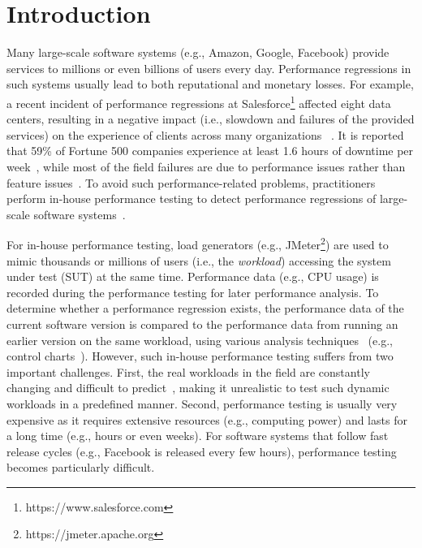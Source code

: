 \section{Introduction} \label{sec:intro}

Many large-scale software systems (e.g., Amazon, Google, Facebook) provide services to millions or even billions of users every day.
Performance regressions in such systems usually lead to both reputational and monetary losses. 
For example, a recent incident of performance regressions at Salesforce\footnote{https://www.salesforce.com} affected eight data centers, resulting in a negative impact (i.e., slowdown and failures of the provided services) on the experience of clients across many organizations ~\citep{SaleForcePerfDegradation2019}.
It is reported that 59\% of Fortune 500 companies experience at least 1.6 hours of downtime per week~\citep{SyncsortWhitePaper2018}, while most of the field failures are due to performance issues rather than feature issues~\citep{DBLP:journals/tse/WeyukerV00}.
To avoid such performance-related problems, practitioners perform in-house performance testing to detect performance regressions of large-scale software systems~\citep{DBLP:journals/tse/JiangH15}.

For in-house performance testing, load generators (e.g., JMeter\footnote{https://jmeter.apache.org}) are used to mimic thousands or millions of users (i.e., the \emph{workload}) accessing the system under test (SUT) at the same time.
Performance data (e.g., CPU usage) is recorded during the performance testing for later performance analysis.
To determine whether a performance regression exists, the performance data of the current software version is compared to the performance data from running an earlier version on the same workload, using various analysis techniques~\citep{DBLP:conf/icst/GaoJBL16} (e.g., control charts~\citep{DBLP:conf/wosp/NguyenAJHNF12}).
However, such in-house performance testing suffers from two important challenges.
First, the real workloads in the field are constantly changing and difficult to predict~\citep{DBLP:conf/wosp/SyerJNHNF14}, making it unrealistic to test such dynamic workloads in a predefined manner.
Second, performance testing is usually very expensive as it requires extensive resources (e.g., computing power) and lasts for a long time (e.g., hours or even weeks).
For software systems that follow fast release cycles (e.g., Facebook is released every few hours), performance testing becomes particularly difficult.


